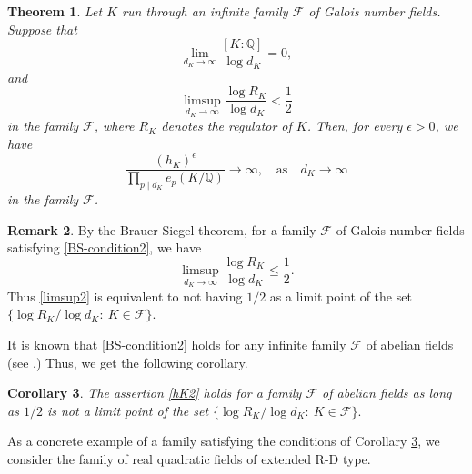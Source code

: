 \documentclass[12pt]{amsart}
\newtheorem{theorem}{Theorem}[section]
\newtheorem{corollary}[theorem]{Corollary}
\theoremstyle{definition}
\newtheorem{remark}[theorem]{Remark}
\numberwithin{equation}{section}
\begin{document}
{\begin{theorem} \label{theorem, Rk=O(dK)}
Let $K$ run through an infinite family $\mathcal{F}$ of Galois number fields.
Suppose that 
\begin{equation}
\label{BS-condition2}
\lim_{d_K { \rightarrow} \infty} \frac{ {[K:\mathbb{Q}]}}{\log {d_K}}=0,
\end{equation}
and 
\begin{equation}
\label{limsup2}
\limsup_{d_K\rightarrow \infty} \frac{\log{R_K}}{\log{d_K}}<\frac{1}{2}
\end{equation}
in the family $\mathcal{F}$, where $R_K$ denotes the regulator of $K$.
Then, for every $\epsilon >0$, we have
\begin{equation}
\label{hK2}
	\frac{(h_K)^{\epsilon}}{\prod_{p \mid d_K}e_p(K/\mathbb{Q})} \rightarrow \infty,  \quad \text{as} \quad d_K \rightarrow \infty
\end{equation} 
in the family $\mathcal{F}$.
\end{theorem}

\begin{remark}
By the Brauer-Siegel theorem, for a family $\mathcal{F}$ of Galois number fields satisfying \eqref{BS-condition2}, we have
\begin{equation*}
\limsup_{d_K\rightarrow \infty} \frac{\log{R_K}}{\log{d_K}}\leq\frac{1}{2}. 
\end{equation*}
Thus \eqref{limsup2} is equivalent to not having $1/2$ as a limit point of the set 
$\{\log{R_K}/\log{d_K}:~K\in \mathcal{F}\}$.
\end{remark}



It is known that \eqref{BS-condition2} holds for any infinite family $\mathcal{F}$ of abelian fields (see \cite[Lemma 2]{Louboutin}.) Thus, we get the following corollary.


\begin{corollary} \label{corollary, 1/2 is not limit abelian}
		The assertion \eqref{hK2} holds for a family $\mathcal{F}$ of abelian fields as long as  $1/2$ is not a limit point of the set 
	$\{\log{R_K}/\log{d_K}:~K\in \mathcal{F}\}.$
\end{corollary}
}
As a concrete example of a family satisfying the conditions of Corollary \ref{corollary, 1/2 is not limit abelian}, we consider the family of real quadratic fields of {extended R-D type}.
\end{document}
